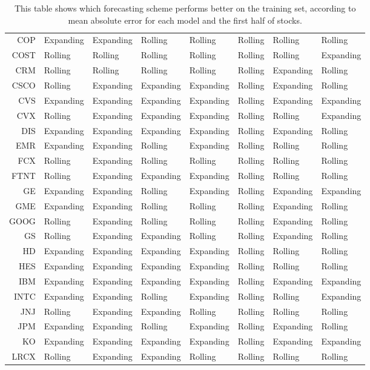 \begin{table}[ht]
\begin{tabular}{rlllllll}
  COP & Expanding & Expanding & Rolling & Rolling & Rolling & Rolling & Rolling \\ 
  COST & Rolling & Rolling & Rolling & Rolling & Rolling & Rolling & Expanding \\ 
  CRM & Rolling & Rolling & Rolling & Rolling & Rolling & Expanding & Rolling \\ 
  CSCO & Rolling & Expanding & Expanding & Expanding & Rolling & Expanding & Rolling \\ 
  CVS & Expanding & Expanding & Expanding & Expanding & Rolling & Expanding & Expanding \\ 
  CVX & Rolling & Expanding & Expanding & Expanding & Rolling & Rolling & Expanding \\ 
  DIS & Expanding & Expanding & Expanding & Expanding & Rolling & Expanding & Rolling \\ 
  EMR & Expanding & Expanding & Rolling & Expanding & Rolling & Rolling & Rolling \\ 
  FCX & Rolling & Expanding & Rolling & Rolling & Rolling & Rolling & Rolling \\ 
  FTNT & Rolling & Expanding & Expanding & Expanding & Rolling & Rolling & Rolling \\ 
  GE & Expanding & Expanding & Rolling & Expanding & Rolling & Expanding & Expanding \\ 
  GME & Expanding & Expanding & Rolling & Rolling & Rolling & Expanding & Rolling \\ 
  GOOG & Rolling & Expanding & Rolling & Rolling & Rolling & Expanding & Rolling \\ 
  GS & Rolling & Expanding & Expanding & Rolling & Rolling & Expanding & Rolling \\ 
  HD & Expanding & Expanding & Expanding & Expanding & Rolling & Rolling & Rolling \\ 
  HES & Expanding & Expanding & Expanding & Expanding & Rolling & Rolling & Rolling \\ 
  IBM & Expanding & Expanding & Expanding & Expanding & Rolling & Expanding & Expanding \\ 
  INTC & Expanding & Expanding & Rolling & Expanding & Rolling & Rolling & Expanding \\ 
  JNJ & Rolling & Expanding & Expanding & Rolling & Rolling & Rolling & Rolling \\ 
  JPM & Expanding & Expanding & Rolling & Expanding & Rolling & Expanding & Rolling \\ 
  KO & Expanding & Expanding & Expanding & Expanding & Rolling & Expanding & Expanding \\ 
  LRCX & Rolling & Expanding & Expanding & Rolling & Rolling & Rolling & Rolling \\ 
   \hline
\end{tabular}
\caption[Better scheme MAE (1)]{This table shows which forecasting scheme performs better on the training set, according to mean absolute error 
              for each model and the first half of stocks.} 
\label{Table:Better_MAE_1}
\end{table}
